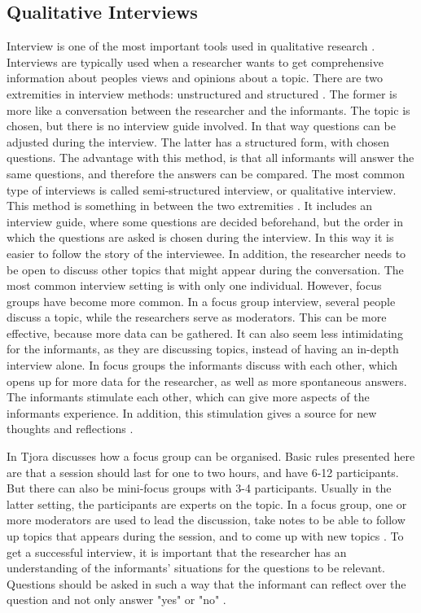 \subsection{Qualitative Interviews}
\label{sec:qualitativeInterviews}
Interview is one of the most important tools used in qualitative research \cite{interview}. Interviews are typically used when a researcher wants to get comprehensive information about peoples views and opinions about a topic. There are two extremities in interview methods: unstructured and structured \cite{qualitative}. The former is more like a conversation between the researcher and the informants. The topic is chosen, but there is no interview guide involved. In that way questions can be adjusted during the interview. The latter has a structured form, with chosen questions. The advantage with this method, is that all informants will answer the same questions, and therefore the answers can be compared. The most common type of interviews is called semi-structured interview, or qualitative interview. This method is something in between the two extremities \cite{qualitative}. It includes an interview guide, where some questions are decided beforehand, but the order in which the questions are asked is chosen during the interview. In this way it is easier to follow the story of the interviewee. In addition, the researcher needs to be open to discuss other topics that might appear during the conversation. The most common interview setting is with only one individual. However, focus groups have become more common. In a focus group interview, several people discuss a topic, while the researchers serve as moderators. This can be more effective, because more data can be gathered. It can also seem less intimidating for the informants, as they are discussing topics, instead of having an in-depth interview alone. In focus groups the informants discuss with each other, which opens up for more data for the researcher, as well as more spontaneous answers. The informants stimulate each other, which can give more aspects of the informants experience. In addition, this stimulation gives a source for new thoughts and reflections \cite{tjora}. 

In \cite{tjora} Tjora discusses how a focus group can be organised. Basic rules presented here are that a session should last for one to two hours, and have 6-12 participants. But there can also be mini-focus groups with 3-4 participants. Usually in the latter setting, the participants are experts on the topic. In a focus group, one or more moderators are used to lead the discussion, take notes to be able to follow up topics that appears during the session, and to come up with new topics \cite{tjora}. To get a successful interview, it is important that the researcher has an understanding of the informants' situations for the questions to be relevant. Questions should be asked in such a way that the informant can reflect over the question and not only answer "yes" or "no" \cite{qualitative}.

